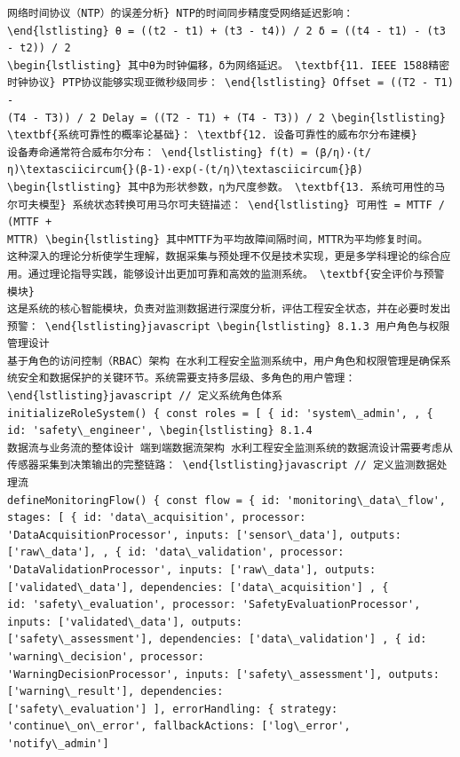 \begin{verbatim}
网络时间协议（NTP）的误差分析} NTP的时间同步精度受网络延迟影响： \end{lstlisting} θ = ((t2 - t1) + (t3 - t4)) / 2 δ = ((t4 - t1) - (t3 - t2)) / 2
\begin{lstlisting} 其中θ为时钟偏移，δ为网络延迟。 \textbf{11. IEEE 1588精密时钟协议} PTP协议能够实现亚微秒级同步： \end{lstlisting} Offset = ((T2 - T1) -
(T4 - T3)) / 2 Delay = ((T2 - T1) + (T4 - T3)) / 2 \begin{lstlisting} \textbf{系统可靠性的概率论基础}： \textbf{12. 设备可靠性的威布尔分布建模}
设备寿命通常符合威布尔分布： \end{lstlisting} f(t) = (β/η)·(t/η)\textasciicircum{}(β-1)·exp(-(t/η)\textasciicircum{}β)
\begin{lstlisting} 其中β为形状参数，η为尺度参数。 \textbf{13. 系统可用性的马尔可夫模型} 系统状态转换可用马尔可夫链描述： \end{lstlisting} 可用性 = MTTF / (MTTF +
MTTR) \begin{lstlisting} 其中MTTF为平均故障间隔时间，MTTR为平均修复时间。
这种深入的理论分析使学生理解，数据采集与预处理不仅是技术实现，更是多学科理论的综合应用。通过理论指导实践，能够设计出更加可靠和高效的监测系统。 \textbf{安全评价与预警模块}
这是系统的核心智能模块，负责对监测数据进行深度分析，评估工程安全状态，并在必要时发出预警： \end{lstlisting}javascript \begin{lstlisting} 8.1.3 用户角色与权限管理设计
基于角色的访问控制（RBAC）架构 在水利工程安全监测系统中，用户角色和权限管理是确保系统安全和数据保护的关键环节。系统需要支持多层级、多角色的用户管理： \end{lstlisting}javascript // 定义系统角色体系
initializeRoleSystem() { const roles = [ { id: 'system\_admin', , { id: 'safety\_engineer', \begin{lstlisting} 8.1.4
数据流与业务流的整体设计 端到端数据流架构 水利工程安全监测系统的数据流设计需要考虑从传感器采集到决策输出的完整链路： \end{lstlisting}javascript // 定义监测数据处理流
defineMonitoringFlow() { const flow = { id: 'monitoring\_data\_flow', stages: [ { id: 'data\_acquisition', processor:
'DataAcquisitionProcessor', inputs: ['sensor\_data'], outputs: ['raw\_data'], , { id: 'data\_validation', processor:
'DataValidationProcessor', inputs: ['raw\_data'], outputs: ['validated\_data'], dependencies: ['data\_acquisition'] , {
id: 'safety\_evaluation', processor: 'SafetyEvaluationProcessor', inputs: ['validated\_data'], outputs:
['safety\_assessment'], dependencies: ['data\_validation'] , { id: 'warning\_decision', processor:
'WarningDecisionProcessor', inputs: ['safety\_assessment'], outputs: ['warning\_result'], dependencies:
['safety\_evaluation'] ], errorHandling: { strategy: 'continue\_on\_error', fallbackActions: ['log\_error',
'notify\_admin'] \end{verbatim}
